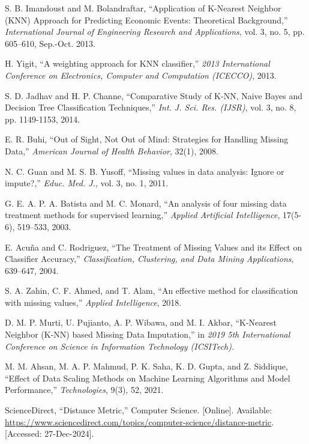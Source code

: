 \documentclass[10pt,twocolumn]{article}
\begin{document}
\begin{thebibliography}{99}
S. B. Imandoust and M. Bolandraftar, ``Application of K-Nearest Neighbor (KNN) Approach for Predicting Economic Events: Theoretical Background,''
\emph{International Journal of Engineering Research and Applications}, vol. 3, no. 5, pp. 605--610, Sep.-Oct. 2013.

H. Yigit, ``A weighting approach for KNN classifier,'' \textit{2013 International Conference on Electronics, Computer and Computation (ICECCO)}, 2013.

S. D. Jadhav and H. P. Channe, ``Comparative Study of K-NN, Naive Bayes and Decision Tree Classification Techniques,'' 
\emph{Int. J. Sci. Res. (IJSR)}, vol. 3, no. 8, pp. 1149-1153, 2014.

E. R. Buhi, ``Out of Sight, Not Out of Mind: Strategies for Handling Missing Data,'' \emph{American Journal of Health Behavior}, 32(1), 2008.

N. C. Guan and M. S. B. Yusoff, ``Missing values in data analysis: Ignore or impute?,'' \emph{Educ. Med. J.}, vol. 3, no. 1, 2011.

G. E. A. P. A. Batista and M. C. Monard, ``An analysis of four missing data treatment methods for supervised learning,'' 
\emph{Applied Artificial Intelligence}, 17(5-6), 519–533, 2003.

E. Acuña and C. Rodriguez, ``The Treatment of Missing Values and its Effect on Classifier Accuracy,'' 
\emph{Classification, Clustering, and Data Mining Applications}, 639–647, 2004.

S. A. Zahin, C. F. Ahmed, and T. Alam, ``An effective method for classification with missing values,'' 
\emph{Applied Intelligence}, 2018.

D. M. P. Murti, U. Pujianto, A. P. Wibawa, and M. I. Akbar, ``K-Nearest Neighbor (K-NN) based Missing Data Imputation,'' 
in \emph{2019 5th International Conference on Science in Information Technology (ICSITech)}.

M. M. Ahsan, M. A. P. Mahmud, P. K. Saha, K. D. Gupta, and Z. Siddique, ``Effect of Data Scaling Methods on Machine Learning Algorithms and Model Performance,'' 
\emph{Technologies}, 9(3), 52, 2021.

ScienceDirect, ``Distance Metric,'' Computer Science. [Online]. Available: \url{https://www.sciencedirect.com/topics/computer-science/distance-metric}. [Accessed: 27-Dec-2024].


\end{thebibliography}
\end{document}
